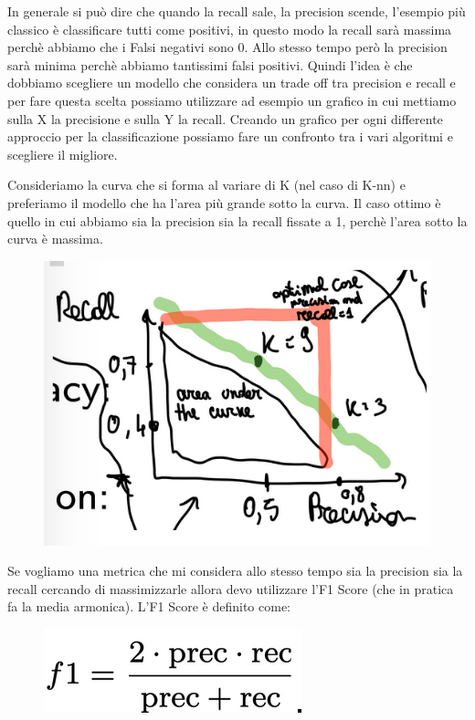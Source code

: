 \documentclass[14pt]{extreport}
\begin{document}
In generale si può dire che quando la recall sale, la precision scende, l’esempio più classico è classificare tutti come positivi, in questo modo la recall sarà massima perchè abbiamo che i Falsi negativi sono 0. Allo stesso tempo però la precision sarà minima perchè abbiamo tantissimi falsi positivi.
Quindi l’idea è che dobbiamo scegliere un modello che considera un trade off tra precision e recall e per fare questa scelta possiamo utilizzare ad esempio un grafico in cui mettiamo sulla X la precisione e sulla Y la recall. Creando un grafico per ogni differente approccio per la classificazione possiamo fare un confronto tra i vari algoritmi e scegliere il migliore.

Consideriamo la curva che si forma al variare di K (nel caso di K-nn) e preferiamo il modello che ha l’area più grande sotto la curva.
Il caso ottimo è quello in cui  abbiamo sia la precision sia la recall fissate a 1, perchè l’area sotto la curva è massima.


\begin{figure}[H] 
	\centering
	\includegraphics[width=0.7\linewidth]{460.jpeg}
	\end{figure}

	Se vogliamo una metrica che mi considera allo stesso tempo sia la precision sia la recall cercando di massimizzarle allora devo utilizzare l’F1 Score (che in pratica fa la media armonica). L’F1 Score è definito come:


\begin{figure}[H] 
	\centering
	\includegraphics[width=0.7\linewidth]{461.jpeg}
	\end{figure}
\end{document}
